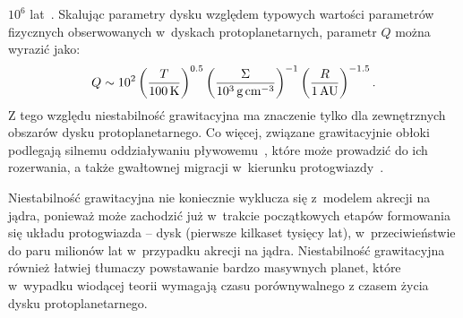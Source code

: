 $10^6$ lat~\cite{HB11, GHB12}. Skalując parametry dysku względem typowych
wartości parametrów fizycznych obserwowanych w~dyskach protoplanetarnych,
parametr $Q$ można wyrazić jako:
%
\begin{equation}
   Q \sim 10^2 
   \left(\frac{T}{100\hbox{$\thinspace\textrm{K}$}}\right)^{0.5}
   \left(\frac{\Sigma}{10^3\hbox{$\thinspace\textrm{g}$}\hbox{$\thinspace\textrm{cm}$}^{-3}}\right)^{-1}
   \left(\frac{R}{1\hbox{$\thinspace\textrm{AU}$}}\right)^{-1.5}.
   \label{eq:Qemp}
\end{equation}
%
Z tego względu niestabilność grawitacyjna ma znaczenie tylko dla zewnętrznych
obszarów dysku protoplanetarnego. Co więcej, związane grawitacyjnie obłoki
podlegają silnemu oddziaływaniu pływowemu~\cite{VH12}, które może prowadzić do
ich rozerwania, a także gwałtownej migracji w~kierunku protogwiazdy~\cite{BMP11}.
\par Niestabilność grawitacyjna nie koniecznie wyklucza się z~modelem akrecji na
jądra, ponieważ może zachodzić już w~trakcie początkowych etapów formowania się
 układu protogwiazda -- dysk (pierwsze kilkaset tysięcy lat), w~przeciwieństwie do
 paru milionów lat w~przypadku akrecji na jądra. Niestabilność grawitacyjna
 również łatwiej tłumaczy powstawanie bardzo masywnych planet, które w~wypadku
 wiodącej teorii wymagają czasu porównywalnego z czasem życia dysku
 protoplanetarnego\cite{HBP}.


